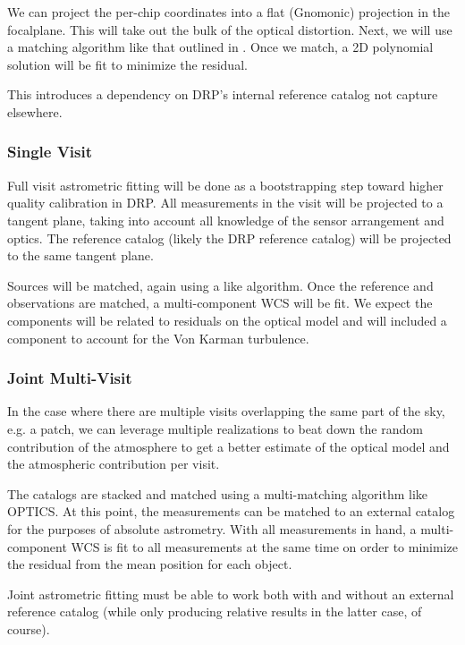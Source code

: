 We can project the per-chip coordinates into a flat (Gnomonic) projection in the focalplane.  This will take out the bulk of the optical distortion.  Next, we will use a matching algorithm like that outlined in \cite{tabur04}.  Once we match, a 2D polynomial solution will be fit to minimize the residual.

\begin{note}[Dependency]
This introduces a dependency on DRP's internal reference catalog not capture elsewhere.
\end{note}

\subsubsection{Single Visit}
\label{sec:acSingleVisitAstrometricFit}
Full visit astrometric fitting will be done as a bootstrapping step toward higher quality calibration in DRP.  All measurements in the visit will be projected to a tangent plane, taking into account all knowledge of the sensor arrangement and optics.  The reference catalog (likely the DRP reference catalog) will be projected to the same tangent plane.

Sources will be matched, again using a \cite{tabor04} like algorithm.  Once the reference and observations are matched, a multi-component WCS will be fit.  We expect the components will be related to residuals on the optical model and will included a component to account for the Von Karman turbulence.

\subsubsection{Joint Multi-Visit}
\label{sec:acJointAstrometricFit}
In the case where there are multiple visits overlapping the same part of the sky, e.g. a patch, we can leverage multiple realizations to beat down the random contribution of the atmosphere to get a better estimate of the optical model and the atmospheric contribution per visit.

The catalogs are stacked and matched using a multi-matching algorithm like OPTICS.  At this point, the measurements can be matched to an external catalog for the purposes of absolute astrometry.  With all measurements in hand, a multi-component WCS is fit to all measurements at the same time on order to minimize the residual from the mean position for each object.

Joint astrometric fitting must be able to work both with and without an external reference catalog (while only producing relative results in the latter case, of course).

